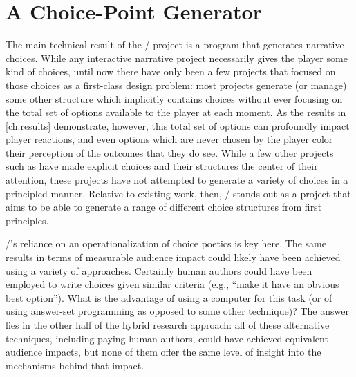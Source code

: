 \section{A Choice-Point Generator}

The main technical result of the \dunyazad/ project is a program that generates narrative choices.
%
While any interactive narrative project necessarily gives the player some kind of choices, until now there have only been a few projects that focused on those choices as a first-class design problem: most projects generate (or manage) some other structure which implicitly contains choices without ever focusing on the total set of options available to the player at each moment.
%
As the results in \cref{ch:results} demonstrate, however, this total set of options can profoundly impact player reactions, and even options which are never chosen by the player color their perception of the outcomes that they do see.
%
While a few other projects such as \citep{Barber2007, Yu2013} have made explicit choices and their structures the center of their attention, these projects have not attempted to generate a variety of choices in a principled manner.
%
Relative to existing work, then, \dunyazad/ stands out as a project that aims to be able to generate a range of different choice structures from first principles.


\dunyazad/'s reliance on an operationalization of choice poetics is key here.
%
The same results in terms of measurable audience impact could likely have been achieved using a variety of approaches.
%
Certainly human authors could have been employed to write choices given similar criteria (e.g., ``make it have an obvious best option'').
%
What is the advantage of using a computer for this task (or of using answer-set programming as opposed to some other technique)?
%
The answer lies in the other half of the hybrid research approach: all of these alternative techniques, including paying human authors, could have achieved equivalent audience impacts, but none of them offer the same level of insight into the mechanisms behind that impact.


